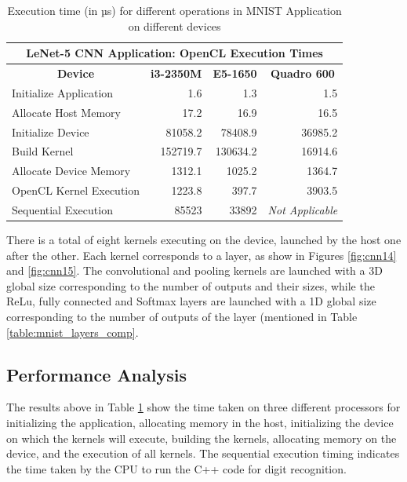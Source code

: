\begin{table}[h!]
\centering
 \caption{Execution time (in µs) for different operations in MNIST Application on different devices}
 \vspace{3mm}
 \renewcommand\arraystretch{1.6}
 \begin{tabular}{ | m{12em} | r | r | r |  }
 \hline
 \multicolumn{4}{|c|}{LeNet-5 CNN Application: OpenCL Execution Times} \\
 \hline
 \multicolumn{1}{|c|}{\bfseries Device} & \multicolumn{1}{c|}{\bfseries i3-2350M} & \multicolumn{1}{c|}{\bfseries E5-1650} & \multicolumn{1}{c|}{\bfseries Quadro 600} \\
 \hline
 Initialize Application & 1.6 & 1.3 & 1.5 \\
 \hline
 Allocate Host Memory & 17.2 & 16.9 & 16.5 \\
 \hline
 Initialize Device & 81058.2 & 78408.9 & 36985.2 \\ 
 \hline
 Build Kernel & 152719.7  & 130634.2 & 16914.6 \\
 \hline
 Allocate Device Memory & 1312.1  & 1025.2 & 1364.7 \\
 \hline
 OpenCL Kernel Execution &1223.8 &  397.7 & 3903.5 \\
 \hline
 Sequential Execution & 85523 &  33892 & \textit{Not Applicable} \\
 \hline
 \end{tabular}
 \label{table:mnist_timings}
\end{table}

There is a total of eight kernels executing on the device, launched by the host one after the other. Each kernel corresponds to a layer, as show in Figures \ref{fig:cnn14} and \ref{fig:cnn15}. The convolutional and pooling kernels are launched with a 3D global size corresponding to the number of outputs and their sizes, while the ReLu, fully connected and Softmax layers are launched with a 1D global size corresponding to the number of outputs of the layer (mentioned in Table \ref{table:mnist_layers_comp}. 

\subsection{Performance Analysis}
\label{sect5_3_3}
The results above in Table \ref{table:mnist_timings} show the time taken on three different processors for initializing the application, allocating memory in the host, initializing the device on which the kernels will execute, building the kernels, allocating memory on the device, and the execution of all kernels. The sequential execution timing indicates the time taken by the CPU to run the C++ code for digit recognition.

